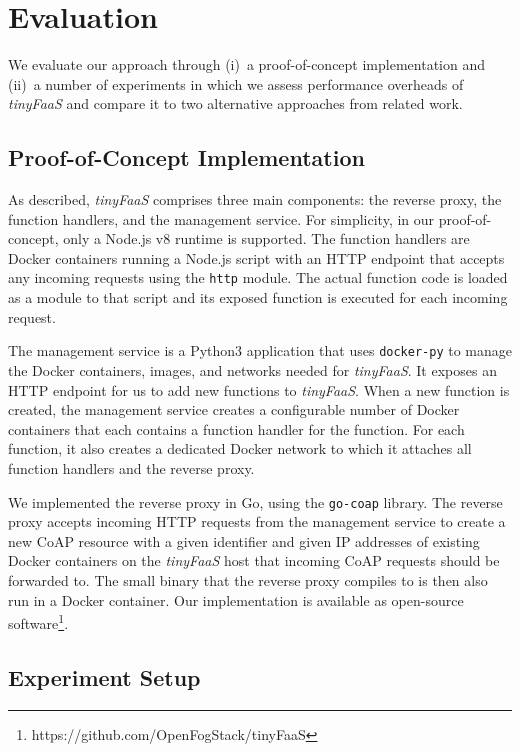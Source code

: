 \chapter{Evaluation}
\label{cha:evaluation}

We evaluate our approach through (i)~a proof-of-concept implementation and (ii)~a number of experiments in which we assess performance overheads of \textit{tinyFaaS} and compare it to two alternative approaches from related work.

\section{Proof-of-Concept Implementation}
\label{sec:implementation}

As described, \textit{tinyFaaS} comprises three main components: the reverse proxy, the function handlers, and the management service.
For simplicity, in our proof-of-concept, only a Node.js v8 runtime is supported.
The function handlers are Docker containers running a Node.js script with an HTTP endpoint that accepts any incoming requests using the \texttt{http} module.
The actual function code is loaded as a module to that script and its exposed function is executed for each incoming request.

The management service is a Python3 application that uses \texttt{docker-py} to manage the Docker containers, images, and networks needed for \textit{tinyFaaS}.
It exposes an HTTP endpoint for us to add new functions to \textit{tinyFaaS}.
When a new function is created, the management service creates a configurable number of Docker containers that each contains a function handler for the function.
For each function, it also creates a dedicated Docker network to which it attaches all function handlers and the reverse proxy.

We implemented the reverse proxy in Go, using the \texttt{go-coap} library.
The reverse proxy accepts incoming HTTP requests from the management service to create a new CoAP resource with a given identifier and given IP addresses of existing Docker containers on the \textit{tinyFaaS} host that incoming CoAP requests should be forwarded to.
The small binary that the reverse proxy compiles to is then also run in a Docker container.
Our implementation is available as open-source software\footnote{https://github.com/OpenFogStack/tinyFaaS}.

\section{Experiment Setup}
\label{sec:experiment}

